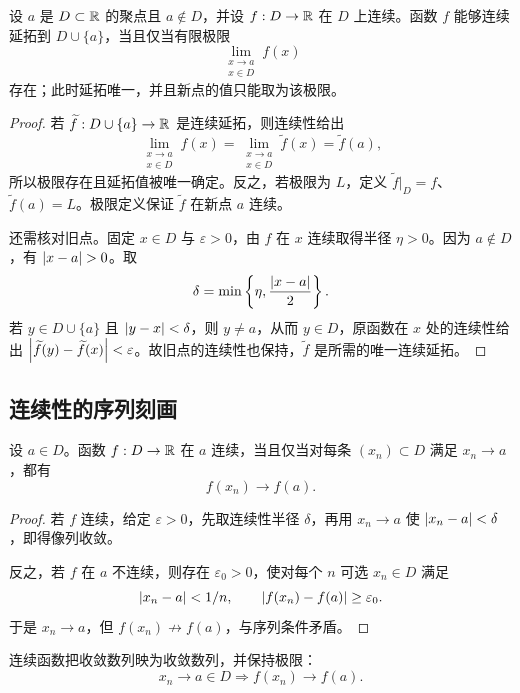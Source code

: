 \begin{proposition}[一点连续延拓]
设 \(a\) 是 \(D\subset\mathbb{R}\) 的聚点且 \(a\notin D\)，并设 \(f:D\to\mathbb{R}\) 在 \(D\) 上连续。函数 \(f\) 能够连续延拓到 \(D\cup\{a\}\)，当且仅当有限极限
\[
 \lim_{\substack{x\to a\\x\in D}}f(x)
\]
存在；此时延拓唯一，并且新点的值只能取为该极限。
\end{proposition}

\begin{proof}
若 \(\widetilde f:D\cup\{a\}\to\mathbb{R}\) 是连续延拓，则连续性给出
\[
 \lim_{\substack{x\to a\\x\in D}}f(x)
 =\lim_{\substack{x\to a\\x\in D}}\widetilde f(x)
 =\widetilde f(a),
\]
所以极限存在且延拓值被唯一确定。反之，若极限为 \(L\)，定义 \(\widetilde f|_D=f\)、\(\widetilde f(a)=L\)。极限定义保证 \(\widetilde f\) 在新点 \(a\) 连续。

还需核对旧点。固定 \(x\in D\) 与 \(\varepsilon>0\)，由 \(f\) 在 \(x\) 连续取得半径 \(\eta>0\)。因为 \(a\notin D\)，有 \(\abs{x-a}>0\)。取
\[
 \delta=\min\left\{\eta,\frac{\left|x-a\right|}2\right\}.
\]
若 \(y\in D\cup\{a\}\) 且 \(\left|y-x\right|<\delta\)，则 \(y\ne a\)，从而 \(y\in D\)，原函数在 \(x\) 处的连续性给出
\(\left|\widetilde f(y)-\widetilde f(x)\right|<\varepsilon\)。故旧点的连续性也保持，\(\widetilde f\) 是所需的唯一连续延拓。
\end{proof}

\subsection{连续性的序列刻画}


\begin{theorem}[序列连续性]
设 \(a\in D\)。函数 \(f:D\to\mathbb{R}\) 在 \(a\) 连续，当且仅当对每条 \((x_n)\subset D\) 满足 \(x_n\to a\)，都有
\[
 f(x_n)\to f(a).
\]
\end{theorem}

\begin{proof}
若 \(f\) 连续，给定 \(\varepsilon>0\)，先取连续性半径 \(\delta\)，再用 \(x_n\to a\) 使 \(\left|x_n-a\right|<\delta\)，即得像列收敛。

反之，若 \(f\) 在 \(a\) 不连续，则存在 \(\varepsilon_0>0\)，使对每个 \(n\) 可选 \(x_n\in D\) 满足
\[
 \left|x_n-a\right|<1/n,\qquad
 \left|f(x_n)-f(a)\right|\ge\varepsilon_0.
\]
于是 \(x_n\to a\)，但 \(f(x_n)\not\to f(a)\)，与序列条件矛盾。
\end{proof}

\begin{corollary}
连续函数把收敛数列映为收敛数列，并保持极限：
\[
 x_n\to a\in D\Longrightarrow f(x_n)\to f(a).
\]
\end{corollary}

